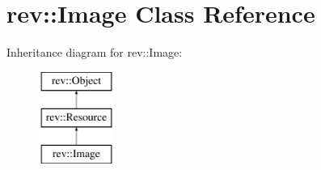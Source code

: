 \hypertarget{classrev_1_1_image}{}\section{rev\+::Image Class Reference}
\label{classrev_1_1_image}
Inheritance diagram for rev\+::Image\+:\begin{figure}[H]
\begin{center}
\leavevmode
\includegraphics[height=3.000000cm]{classrev_1_1_image}
\end{center}
\end{figure}
